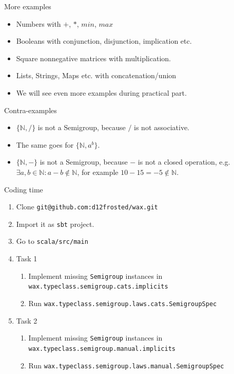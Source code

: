 \documentclass[presentation,aspectratio=169,smaller]{beamer}
\begin{document}
\begin{frame}[label={sec:org64a0d7c}]{More examples}
\begin{itemize}
\item Numbers with \(+\), \(*\), \(min\), \(max\)
\item Booleans with conjunction, disjunction, implication etc.
\item Square nonnegative matrices with multiplication.
\item Lists, Strings, Maps etc. with concatenation/union
\item We will see even more examples during practical part.
\end{itemize}
\end{frame}

\begin{frame}[label={sec:org1ece88a}]{Contra-examples}
\begin{itemize}
\item \(\{\mathbb{N}, /\}\) is not a Semigroup, because \(/\) is not associative.
\item The same goes for \(\{\mathbb{N}, a^b \}\).
\item \(\{\mathbb{N}, -\}\) is not a Semigroup, because \(-\) is not a closed operation,
e.g. \(\exists a, b \in \mathbb{N}: a - b \notin \mathbb{N}\),
for example \(10 - 15 = -5 \notin \mathbb{N}\).
\end{itemize}
\end{frame}

\begin{frame}[label={sec:org8b39d16},fragile]{Coding time}
 \begin{enumerate}
\item <1-> Clone \texttt{git@github.com:d12frosted/wax.git}
\item <1-> Import it as \texttt{sbt} project.
\item <1-> Go to \texttt{scala/src/main}
\item <2-> Task 1
\begin{enumerate}
\item Implement missing \texttt{Semigroup} instances in
\texttt{wax.typeclass.semigroup.cats.implicits}
\item Run \texttt{wax.typeclass.semigroup.laws.cats.SemigroupSpec}
\end{enumerate}
\item <3-> Task 2
\begin{enumerate}
\item Implement missing \texttt{Semigroup} instances in
\texttt{wax.typeclass.semigroup.manual.implicits}
\item Run \texttt{wax.typeclass.semigroup.laws.manual.SemigroupSpec}
\end{enumerate}
\end{enumerate}
\end{frame}
\end{document}
